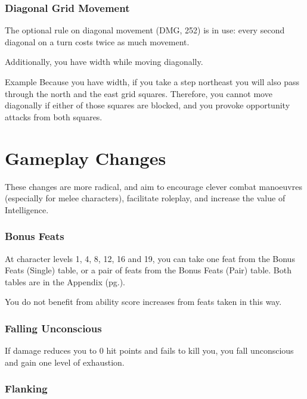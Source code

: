 \documentclass[letterpaper,twocolumn,openany,nodeprecatedcode]{dndbook}
\newcommand{\pg}[1]{pg.\pageref{#1}}
\begin{document}
\subsection{Diagonal Grid Movement}
The optional rule on diagonal movement (DMG, 252) is in use: every second diagonal on a turn costs twice as much movement.

Additionally, you have width while moving diagonally. 

\begin{DndComment}{Example}
Because you have width, if you take a step northeast you will also pass through the north and the east grid squares. Therefore, you cannot move diagonally if either of those squares are blocked, and you provoke opportunity attacks from both squares.
\end{DndComment}







\chapter{Gameplay Changes}

These changes are more radical, and aim to encourage clever combat manoeuvres (especially for melee characters), facilitate roleplay, and increase the value of Intelligence.

\label{gameplay-feats-bonus}
\subsection{Bonus Feats}
At character levels 1, 4, 8, 12, 16 and 19, you can take one feat from the Bonus Feats (Single) table, or a pair of feats from the Bonus Feats (Pair) table. Both tables are in the Appendix (\pg{appendix-feats-bonus-table}).

You do not benefit from ability score increases from feats taken in this way.

\subsection{Falling Unconscious}
If damage reduces you to 0 hit points and fails to kill you, you fall unconscious and gain one level of exhaustion.

\subsection{Flanking}
\end{document}

